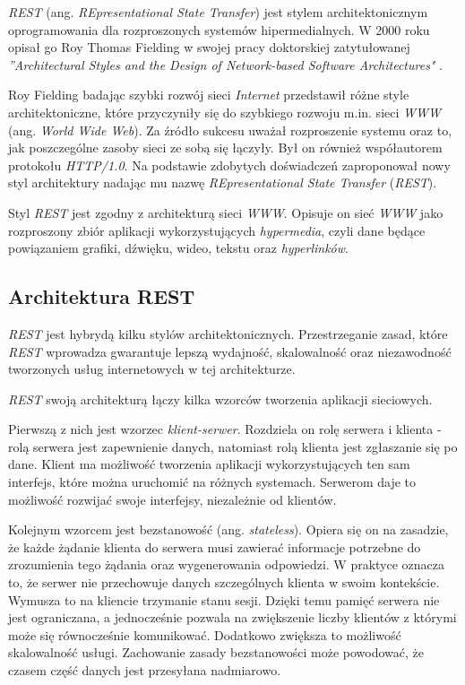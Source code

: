 \textsl{REST} (ang. \textsl{REpresentational State Transfer}) jest stylem architektonicznym oprogramowania dla rozproszonych systemów hipermedialnych. W 2000 roku opisał go Roy Thomas Fielding w swojej pracy doktorskiej zatytułowanej \textsl{''Architectural Styles and the Design of Network-based Software Architectures"} \cite{restinpractice}.

Roy Fielding badając  szybki rozwój sieci \textsl{Internet} przedstawił różne style architektoniczne, które przyczyniły się do szybkiego rozwoju m.in. sieci \textsl{WWW} (ang. \textsl{World Wide Web}). Za źródło sukcesu  uważał rozproszenie systemu oraz to, jak poszczególne zasoby sieci ze sobą się łączyły. Był on również współautorem protokołu \textsl{HTTP/1.0}. Na podstawie zdobytych doświadczeń zaproponował nowy styl  architektury nadając mu nazwę \textsl{REpresentational State Transfer} (\textsl{REST}).  

Styl \textsl{REST} jest  zgodny z architekturą sieci \textsl{WWW}. Opisuje on sieć \textsl{WWW} jako rozproszony zbiór aplikacji wykorzystujących \textsl{hypermedia}, czyli dane będące powiązaniem grafiki, dźwięku, wideo, tekstu oraz \textsl{hyperlinków}. 

\subsection{Architektura REST}
\textsl{REST} jest hybrydą kilku stylów architektonicznych. Przestrzeganie zasad, które \textsl{REST} wprowadza gwarantuje lepszą wydajność, skalowalność oraz niezawodność tworzonych usług internetowych w tej architekturze. 

\textsl{REST} swoją architekturą łączy kilka wzorców tworzenia aplikacji sieciowych.

Pierwszą z nich jest wzorzec \textsl{klient-serwer}. Rozdziela on rolę serwera i klienta - rolą serwera jest zapewnienie danych, natomiast rolą klienta jest zgłaszanie się po dane. Klient ma możliwość tworzenia aplikacji wykorzystujących ten sam interfejs, które można uruchomić na różnych systemach. Serwerom daje to możliwość rozwijać swoje interfejsy, niezależnie od klientów. 

Kolejnym wzorcem jest bezstanowość (ang. \textsl{stateless}). Opiera się on na zasadzie, że każde żądanie klienta do serwera musi zawierać informacje potrzebne do zrozumienia tego żądania oraz wygenerowania odpowiedzi. W praktyce oznacza to, że serwer nie przechowuje danych szczególnych klienta w swoim kontekście. Wymusza to na kliencie trzymanie stanu sesji. Dzięki temu pamięć serwera nie jest ograniczana, a jednocześnie pozwala na zwiększenie liczby klientów z którymi może się równocześnie komunikować. Dodatkowo zwiększa to możliwość skalowalność usługi. Zachowanie zasady bezstanowości może powodować, że czasem część danych jest przesyłana nadmiarowo.

